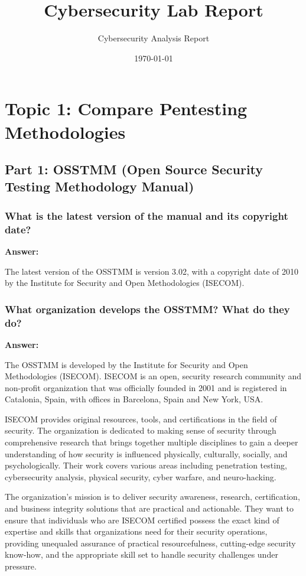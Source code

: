 \documentclass[12pt,a4paper]{article}
\title{Cybersecurity Lab Report}
\author{Cybersecurity Analysis Report}
\date{\today}
\begin{document}
\maketitle
\tableofcontents
\newpage

\section{Topic 1: Compare Pentesting Methodologies}

\subsection{Part 1: OSSTMM (Open Source Security Testing Methodology Manual)}

\subsubsection{What is the latest version of the manual and its copyright date?}

\textbf{Answer:}

The latest version of the OSSTMM is version 3.02, with a copyright date of 2010 by the Institute for Security and Open Methodologies (ISECOM).

\subsubsection{What organization develops the OSSTMM? What do they do?}

\textbf{Answer:}

The OSSTMM is developed by the Institute for Security and Open Methodologies (ISECOM). ISECOM is an open, security research community and non-profit organization that was officially founded in 2001 and is registered in Catalonia, Spain, with offices in Barcelona, Spain and New York, USA.

ISECOM provides original resources, tools, and certifications in the field of security. The organization is dedicated to making sense of security through comprehensive research that brings together multiple disciplines to gain a deeper understanding of how security is influenced physically, culturally, socially, and psychologically. Their work covers various areas including penetration testing, cybersecurity analysis, physical security, cyber warfare, and neuro-hacking.

The organization's mission is to deliver security awareness, research, certification, and business integrity solutions that are practical and actionable. They want to ensure that individuals who are ISECOM certified possess the exact kind of expertise and skills that organizations need for their security operations, providing unequaled assurance of practical resourcefulness, cutting-edge security know-how, and the appropriate skill set to handle security challenges under pressure.
\end{document}
